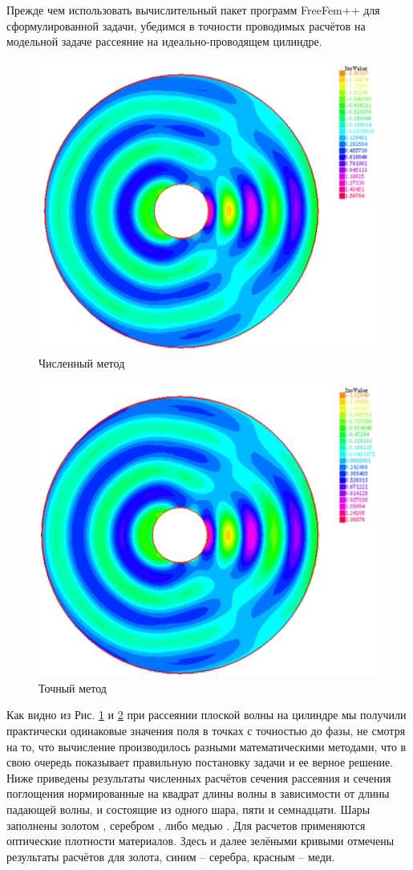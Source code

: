 Прежде чем использовать вычислительный пакет программ FreeFem++ для сформулированной задачи, убедимся в точности проводимых расчётов на модельной задаче рассеяние на идеально-проводящем цилиндре.
\begin{figure}[h!]
	\centering
	\includegraphics[width=0.8\linewidth]{sc1.png}
	\caption{Численный метод}
	\label{fig:sc1}
\end{figure} 
\newpage
\begin{figure}[h!]
	\centering
	\includegraphics[width=0.8\linewidth]{sc2.png}
	\caption{Точный метод}
	\label{fig:sc2}
\end{figure}
Как видно из Рис. \ref{fig:sc1} и \ref{fig:sc2} при рассеянии плоской волны на цилиндре мы получили практически одинаковые значения поля в точках с точностью до фазы, не смотря на то, что вычисление производилось разными математическими методами, что в свою очередь показывает правильную постановку задачи и ее верное решение. \\ 
Ниже приведены результаты численных расчётов сечения рассеяния и сечения поглощения нормированные на квадрат длины волны в зависимости от длины падающей волны, и состоящие из одного шара, пяти и семнадцати. Шары заполнены золотом \cite{Olmon2012}, серебром \cite{Yang2015}, либо медью \cite{Querry1985}. Для расчетов применяются оптические плотности материалов. Здесь и далее зелёными кривыми отмечены результаты расчётов для золота, синим – серебра, красным – меди.

